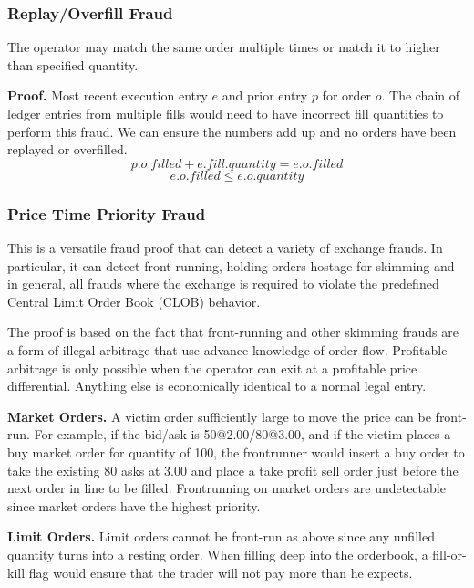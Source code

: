 \documentclass[12pt,a4paper]{article}
\begin{document}
\subsubsection{Replay/Overfill Fraud} \label{fp:rof}
The operator may match the same order multiple times or match it to higher than specified quantity.

\textbf{Proof.}
Most recent execution entry $e$ and prior entry $p$ for order $o$. The chain of ledger entries from multiple fills would need to have incorrect fill quantities to perform this fraud. We can ensure the numbers add up and no orders have been replayed or overfilled.
\begin{equation}p.o.filled + e.fill.quantity = e.o.filled\end{equation}
\begin{equation}
    e.o.filled \leq e.o.quantity
\end{equation}
\subsubsection{Price Time Priority Fraud}\label{fp:ptp}
This is a versatile fraud proof that can detect a variety of exchange frauds. In particular, it can detect front running, holding orders hostage for skimming and in general, all frauds where the exchange is required to violate the predefined Central Limit Order Book (CLOB) behavior.

The proof is based on the fact that front-running and other skimming frauds are a form of illegal arbitrage that use advance knowledge of order flow. Profitable arbitrage is only possible when the operator can exit at a profitable price differential. Anything else is economically identical to a normal legal entry.

\textbf{Market Orders.} A victim order sufficiently large to move the price can be front-run. For example, if the bid/ask is 50@2.00/80@3.00, and if the victim places a buy market order for quantity of 100, the frontrunner would insert a buy order to take the existing 80 asks at 3.00 and place a take profit sell order just before the next order in line to be filled. Frontrunning on market orders are undetectable since market orders have the highest priority.

\textbf{Limit Orders.} Limit orders cannot be front-run as above since any unfilled quantity turns into a resting order. When filling deep into the orderbook, a fill-or-kill flag would ensure that the trader will not pay more than he expects.
\end{document}
